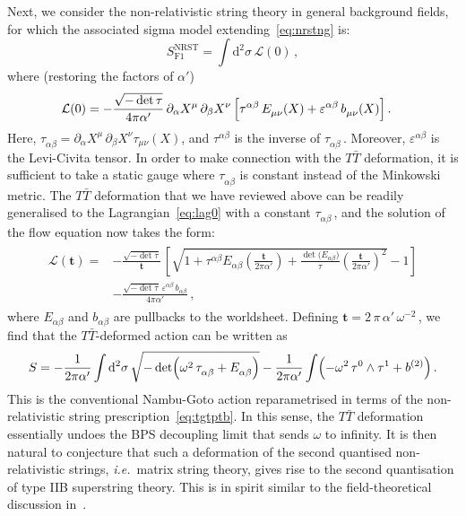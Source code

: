 \documentclass[11pt]{article}
\newcommand{\be}{\begin{equation}}
\newcommand{\ee}{\end{equation}}
\newcommand{\CL}{\mathcal{L}}
\newcommand{\p}{\partial}
\renewcommand{\emph}[1]{\textit{#1}}
\newcommand{\dd}{\mathrm{d}}
\newcommand{\lambdap}{\boldsymbol{t}}
\begin{document}
Next, we consider the non-relativistic string theory in general background fields, for which the associated sigma model extending~\eqref{eq:nrstng} is:
%
\be \label{eq:nganrst}
    S^\text{NRST}_\text{F1} = \int \dd^2 \sigma \, \CL(0)\,,
\ee
%
where (restoring the factors of $\alpha'$)
%
\begin{align} \label{eq:lag0} 
    \CL(0) & = - \frac{\sqrt{-\det \tau}}{4\pi\alpha'} \, \p_\alpha X^\mu \, \p_\beta X^\nu \, \Bigl[ \tau^{\alpha\beta} \, 
    E^{}_{\mu\nu} (X) + \varepsilon^{\alpha\beta} \, b^{}_{\mu\nu} (X) \Bigr]\,. 
\end{align}
%
Here, $\tau^{}_{\alpha\beta} = \p^{}_\alpha X^\mu \, \p^{}_\beta X^\nu  \tau^{}_{\mu\nu} (X)$, and $\tau^{\alpha\beta}$ is the inverse of $\tau^{}_{\alpha\beta}$\,. Moreover, $\varepsilon^{\alpha\beta}$ is the Levi-Civita tensor.  In order to make connection
with the $T\bar{T}$ deformation, it is sufficient to take a static gauge where $\tau^{}_{\alpha\beta}$ is constant instead of the Minkowski metric. 
The $T\bar{T}$ deformation that we have reviewed above can be readily generalised to the Lagrangian~\eqref{eq:lag0} with a constant $\tau^{}_{\alpha\beta}$\,, and the solution of the flow equation now takes the form: 
%
\begin{align}
\begin{split}
    \CL (\lambdap) = & - \frac{\sqrt{-\det \tau}}{\lambdap} \, \left[ \sqrt{1 + \tau^{\alpha \beta} E^{}_{\alpha \beta} \left(\frac{\lambdap}{2\pi\alpha'} \right) + \frac{\det \bigl( E_{\alpha \beta} \bigr)}{\tau} \left(\frac{\lambdap}{2\pi\alpha'}\right)^{\!\!2}} - 1 \right] \\[4pt]
    & - \frac{\sqrt{-\det\tau} \, \varepsilon^{\alpha\beta} \, b^{}_{\alpha\beta}}{4\pi\alpha'}\,,
\label{eq:F1FlowSoln}
\end{split}
\end{align}
%
where $E_{\alpha\beta}$ and $b_{\alpha\beta}$ are pullbacks to the worldsheet.
Defining $\lambdap = 2 \, \pi \, \alpha' \, \omega^{-2}$\,, we find that the $T\bar{T}$-deformed action can be written as 
%
\be \label{eq:odnga}
    S = - \frac{1}{2\pi\alpha'} \int \dd^2 \sigma \, \sqrt{-\det \Bigl( \omega^2 \, \tau^{}_{\alpha\beta} + E^{}_{\alpha\beta} \Bigr)} - \frac{1}{2\pi\alpha'} \int \Bigl( - \omega^2 \, \tau^0 \wedge \tau^1 + b^{(2)} \Bigr)\,.
\ee
%
This is the conventional Nambu-Goto action reparametrised in terms of the non-relativistic string prescription~\eqref{eq:tgtptb}. In this sense, the $T\bar{T}$ deformation essentially undoes the BPS decoupling limit that sends $\omega$ to infinity. It is then natural to conjecture that such a deformation of the second quantised non-relativistic strings, \emph{i.e.}~matrix string theory, gives rise to the second quantisation of type IIB superstring theory. This is in spirit similar to the field-theoretical discussion in~\cite{Benjamin:2023nts}.
\end{document}
